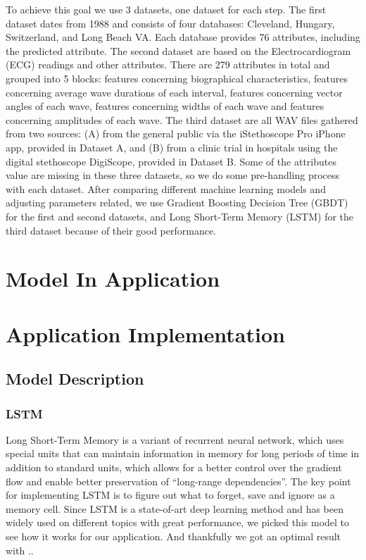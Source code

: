 \documentclass[letterpaper]{article} %
\begin{document}
To achieve this goal we use 3 datasets, one dataset for each step. The first dataset dates from 1988 and consists of four databases: Cleveland, Hungary, Switzerland, and Long Beach VA. Each database provides 76 attributes, including the predicted attribute. The second dataset are based on the Electrocardiogram (ECG) readings and other attributes. There are 279 attributes in total and grouped into 5 blocks: features concerning biographical characteristics, features concerning average wave durations of each interval, features concerning vector angles of each wave, features concerning widths of each wave and features concerning amplitudes of each wave. The third dataset are all WAV files gathered from two sources: (A) from the general public via the iStethoscope Pro iPhone app, provided in Dataset A, and (B) from a clinic trial in hospitals using the digital stethoscope DigiScope, provided in Dataset B. Some of the attributes value are missing in these three datasets, so we do some pre-handling process with each dataset. After comparing different machine learning models and adjusting parameters related, we use Gradient Boosting Decision Tree (GBDT) for the first and second datasets, and Long Short-Term Memory (LSTM) for the third dataset because of their good performance.


\section{Model In Application}

\section{Application Implementation}

\subsection{Model Description}

\subsubsection{LSTM}

Long Short-Term Memory is a variant of recurrent neural network, which uses special units that can maintain information in memory for long periods of time in addition to standard units, which allows for a better control over the gradient flow and enable better preservation of “long-range dependencies”. The key point for implementing LSTM is to figure out what to forget, save and ignore as a memory cell. Since LSTM is a state-of-art deep learning method and has been widely used on different topics with great performance, we picked this model to see how it works for our application. And thankfully we got an optimal result with ..%
\end{document}
